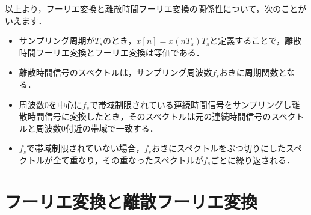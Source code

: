 以上より，フーリエ変換と離散時間フーリエ変換の関係性について，次のことがいえます．
\begin{itemize}
\item サンプリング周期が$T_s$のとき，$x[n]=x(nT_s)T_s$と定義することで，離散時間フーリエ変換とフーリエ変換は等価である．
\item 離散時間信号のスペクトルは，サンプリング周波数$f_s$おきに周期関数となる．
\item 周波数0を中心に$f_s$で帯域制限されている連続時間信号をサンプリングし離散時間信号に変換したとき，そのスペクトルは元の連続時間信号のスペクトルと周波数0付近の帯域で一致する．
\item $f_s$で帯域制限されていない場合，$f_s$おきにスペクトルをぶつ切りにしたスペクトルが全て重なり，その重なったスペクトルが$f_s$ごとに繰り返される．
\end{itemize}


\section{フーリエ変換と離散フーリエ変換}

